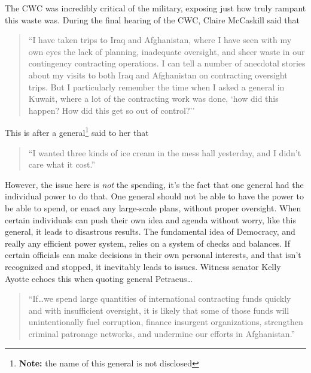 \documentclass[12pt, twoside]{article}
\begin{document}
        The CWC was incredibly critical of the military, exposing just how truly rampant this waste was. During the final hearing of the CWC, Claire McCaskill said that 
        
        \begin{quote}
            ``I have taken trips to Iraq and Afghanistan, where I have seen with my own eyes the lack of planning, inadequate oversight, and sheer waste in our contingency contracting operations. I can tell a number of anecdotal stories about my visits to both Iraq and Afghanistan on contracting oversight trips. But I particularly remember the time when I asked a general in Kuwait, where a lot of the contracting work was done, `how did this happen? How did this get so out of control?''~\parencite{us_senate2011wartime_contracting}
        \end{quote}

        This is after a general\footnote{\textbf{Note:} the name of this general is not disclosed} said to her that 

        \begin{quote}
            ``I wanted three kinds of ice cream in the mess hall yesterday, and I didn't care what it cost.''~\parencite{us_senate2011wartime_contracting}
        \end{quote}

        However, the issue here is \textit{not} the spending, it's the fact that one general had the individual power to do that. One general should not be able to have the power to be able to spend, or enact any large-scale plans, without proper oversight. When certain individuals can push their own idea and agenda without worry, like this general, it leads to disastrous results. The fundamental idea of Democracy, and really any efficient power system, relies on a system of checks and balances. If certain officials can make decisions in their own personal interests, and that isn't recognized and stopped, it inevitably leads to issues. Witness senator Kelly Ayotte echoes this when quoting general Petraeus\ldots

        \begin{quote}
            ``If\ldots we spend large quantities of international contracting funds quickly and with insufficient oversight, it is likely that some of those funds will unintentionally fuel corruption, finance insurgent organizations, strengthen criminal patronage networks, and undermine our efforts in Afghanistan.'' \parencite{us_senate2011wartime_contracting}
        \end{quote}
\end{document}
